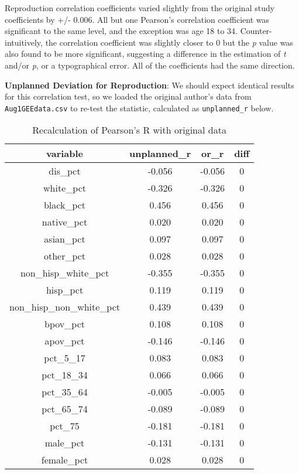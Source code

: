 \documentclass[
]{article}
\begin{document}
Reproduction correlation coefficients varied slightly from the original
study coefficients by +/- 0.006. All but one Pearson's correlation
coefficient was significant to the same level, and the exception was age
18 to 34. Counter-intuitively, the correlation coefficient was slightly
closer to 0 but the \emph{p} value was also found to be more
significant, suggesting a difference in the estimation of \emph{t}
and/or \emph{p}, or a typographical error. All of the coefficients had
the same direction.

\textbf{Unplanned Deviation for Reproduction}: We should expect
identical results for this correlation test, so we loaded the original
author's data from \texttt{Aug1GEEdata.csv} to re-test the statistic,
calculated as \texttt{unplanned\_r} below.

\begin{table}

\caption{\label{tab:original-data-pearson-correlation}Recalculation of Pearson's R with original data}
\centering
\begin{tabular}[t]{c|c|c|c}
\hline
variable & unplanned\_r & or\_r & diff\\
\hline
dis\_pct & -0.056 & -0.056 & 0\\
\hline
white\_pct & -0.326 & -0.326 & 0\\
\hline
black\_pct & 0.456 & 0.456 & 0\\
\hline
native\_pct & 0.020 & 0.020 & 0\\
\hline
asian\_pct & 0.097 & 0.097 & 0\\
\hline
other\_pct & 0.028 & 0.028 & 0\\
\hline
non\_hisp\_white\_pct & -0.355 & -0.355 & 0\\
\hline
hisp\_pct & 0.119 & 0.119 & 0\\
\hline
non\_hisp\_non\_white\_pct & 0.439 & 0.439 & 0\\
\hline
bpov\_pct & 0.108 & 0.108 & 0\\
\hline
apov\_pct & -0.146 & -0.146 & 0\\
\hline
pct\_5\_17 & 0.083 & 0.083 & 0\\
\hline
pct\_18\_34 & 0.066 & 0.066 & 0\\
\hline
pct\_35\_64 & -0.005 & -0.005 & 0\\
\hline
pct\_65\_74 & -0.089 & -0.089 & 0\\
\hline
pct\_75 & -0.181 & -0.181 & 0\\
\hline
male\_pct & -0.131 & -0.131 & 0\\
\hline
female\_pct & 0.028 & 0.028 & 0\\
\hline
\end{tabular}
\end{table}
\end{document}

